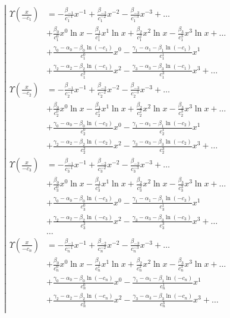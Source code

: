 \begin{equation*} \left| \begin{aligned}
\Upsilon{\left (\frac{x}{- c_1} \right)} &=
- \frac{\beta_{-1}}{c_1^{-1}} x^{-1}
+ \frac{\beta_{-2}}{c_1^{-2}} x^{-2}
- \frac{\beta_{-3}}{c_1^{-3}} x^{-3}
+ \ldots \\ &
+ \frac{\beta_0}{c_1^0} x^0 \ln{x}
- \frac{\beta_1}{c_1^1} x^1 \ln{x}
+ \frac{\beta_2}{c_1^2} x^2 \ln{x}
- \frac{\beta_3}{c_1^3} x^3 \ln{x}
+ \ldots \\ &
+ \frac{\gamma_0 - \alpha_0 - \beta_0 \ln{(- c_1)}}{c_1^0} x^0
- \frac{\gamma_1 - \alpha_1 - \beta_1 \ln{(- c_1)}}{c_1^1} x^1 \\ &
+ \frac{\gamma_2 - \alpha_2 - \beta_2 \ln{(- c_1)}}{c_1^2} x^2
- \frac{\gamma_3 - \alpha_3 - \beta_3 \ln{(- c_1)}}{c_1^3} x^3
+ \ldots \\
%
\Upsilon{\left (\frac{x}{- c_2} \right)} &=
- \frac{\beta_{-1}}{c_2^{-1}} x^{-1}
+ \frac{\beta_{-2}}{c_2^{-2}} x^{-2}
- \frac{\beta_{-3}}{c_2^{-3}} x^{-3}
+ \ldots \\ &
+ \frac{\beta_0}{c_2^0} x^0 \ln{x}
- \frac{\beta_1}{c_2^1} x^1 \ln{x}
+ \frac{\beta_2}{c_2^2} x^2 \ln{x}
- \frac{\beta_3}{c_2^3} x^3 \ln{x}
+ \ldots \\ &
+ \frac{\gamma_0 - \alpha_0 - \beta_0 \ln{(- c_2)}}{c_2^0} x^0
- \frac{\gamma_1 - \alpha_1 - \beta_1 \ln{(- c_2)}}{c_2^1} x^1 \\ &
+ \frac{\gamma_2 - \alpha_2 - \beta_2 \ln{(- c_2)}}{c_2^2} x^2
- \frac{\gamma_3 - \alpha_3 - \beta_3 \ln{(- c_2)}}{c_2^3} x^3
+ \ldots \\
%
\Upsilon{\left (\frac{x}{- c_3} \right)} &=
- \frac{\beta_{-1}}{c_3^{-1}} x^{-1}
+ \frac{\beta_{-2}}{c_3^{-2}} x^{-2}
- \frac{\beta_{-3}}{c_3^{-3}} x^{-3}
+ \ldots \\ &
+ \frac{\beta_0}{c_3^0} x^0 \ln{x}
- \frac{\beta_1}{c_3^1} x^1 \ln{x}
+ \frac{\beta_2}{c_3^2} x^2 \ln{x}
- \frac{\beta_3}{c_3^3} x^3 \ln{x}
+ \ldots \\ &
+ \frac{\gamma_0 - \alpha_0 - \beta_0 \ln{(- c_3)}}{c_3^0} x^0
- \frac{\gamma_1 - \alpha_1 - \beta_1 \ln{(- c_3)}}{c_3^1} x^1 \\ &
+ \frac{\gamma_2 - \alpha_2 - \beta_2 \ln{(- c_3)}}{c_3^2} x^2
- \frac{\gamma_3 - \alpha_3 - \beta_3 \ln{(- c_3)}}{c_3^3} x^3
+ \ldots \\
%
&\ldots \\
%
\Upsilon{\left (\frac{x}{- c_n} \right)} &=
- \frac{\beta_{-1}}{c_n^{-1}} x^{-1}
+ \frac{\beta_{-2}}{c_n^{-2}} x^{-2}
- \frac{\beta_{-3}}{c_n^{-3}} x^{-3}
+ \ldots \\ &
+ \frac{\beta_0}{c_n^0} x^0 \ln{x}
- \frac{\beta_1}{c_n^1} x^1 \ln{x}
+ \frac{\beta_2}{c_n^2} x^2 \ln{x}
- \frac{\beta_3}{c_n^3} x^3 \ln{x}
+ \ldots \\ &
+ \frac{\gamma_0 - \alpha_0 - \beta_0 \ln{(- c_n)}}{c_n^0} x^0
- \frac{\gamma_1 - \alpha_1 - \beta_1 \ln{(- c_n)}}{c_n^1} x^1 \\ &
+ \frac{\gamma_2 - \alpha_2 - \beta_2 \ln{(- c_n)}}{c_n^2} x^2
- \frac{\gamma_3 - \alpha_3 - \beta_3 \ln{(- c_n)}}{c_n^3} x^3
+ \ldots \\
\end{aligned} \right. \end{equation*}

